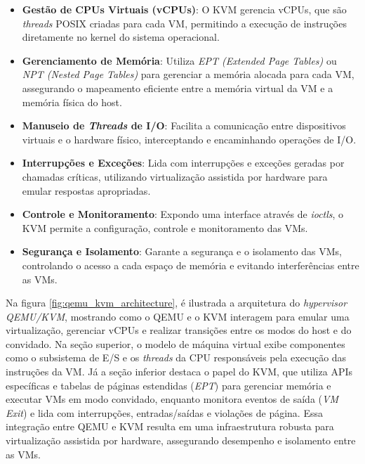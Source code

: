 \begin{itemize}
    \item \textbf{Gestão de CPUs Virtuais (vCPUs)}: O KVM gerencia vCPUs, que são \textit{threads} POSIX criadas para cada VM, permitindo a execução de instruções diretamente no kernel do sistema operacional.
  
    \item \textbf{Gerenciamento de Memória}: Utiliza \textit{EPT (Extended Page Tables)} ou \textit{NPT (Nested Page Tables)} para gerenciar a memória alocada para cada VM, assegurando o mapeamento eficiente entre a memória virtual da VM e a memória física do host.

    \item \textbf{Manuseio de \textit{Threads} de I/O}: Facilita a comunicação entre dispositivos virtuais e o hardware físico, interceptando e encaminhando operações de I/O.

    \item \textbf{Interrupções e Exceções}: Lida com interrupções e exceções geradas por chamadas críticas, utilizando virtualização assistida por hardware para emular respostas apropriadas.

    \item \textbf{Controle e Monitoramento}: Expondo uma interface através de \textit{ioctls}, o KVM permite a configuração, controle e monitoramento das VMs.

    \item \textbf{Segurança e Isolamento}: Garante a segurança e o isolamento das VMs, controlando o acesso a cada espaço de memória e evitando interferências entre as VMs.
\end{itemize}

Na figura \ref{fig:qemu_kvm_architecture}, é ilustrada a arquitetura do \textit{hypervisor QEMU/KVM}, mostrando como o QEMU e o KVM interagem para emular uma virtualização, gerenciar vCPUs e realizar transições entre os modos do host e do convidado. Na seção superior, o modelo de máquina virtual exibe componentes como o subsistema de E/S e os \textit{threads} da CPU responsáveis pela execução das instruções da VM. Já a seção inferior destaca o papel do KVM, que utiliza APIs específicas e tabelas de páginas estendidas (\textit{EPT}) para gerenciar memória e executar VMs em modo convidado, enquanto monitora eventos de saída (\textit{VM Exit}) e lida com interrupções, entradas/saídas e violações de página. Essa integração entre QEMU e KVM resulta em uma infraestrutura robusta para virtualização assistida por hardware, assegurando desempenho e isolamento entre as VMs.

